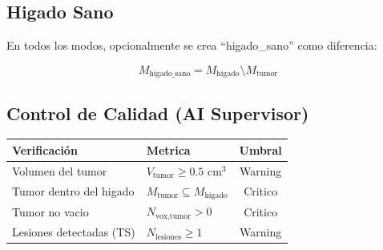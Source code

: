 \documentclass[12pt,a4paper]{article}
\begin{document}
\subsection{Higado Sano}

En todos los modos, opcionalmente se crea ``higado\_sano'' como diferencia:

\begin{equation}\label{eq:higado_sano}
    M_{\text{higado\_sano}} = M_{\text{higado}} \setminus M_{\text{tumor}}
\end{equation}


\begin{tcolorbox}[aiSupervisor]
\subsection*{Control de Calidad (AI Supervisor)}

\begin{table}[H]
\centering
\begin{tabular}{llc}
\toprule
\textbf{Verificación} & \textbf{Metrica} & \textbf{Umbral} \\
\midrule
Volumen del tumor & $V_{\text{tumor}} \geq 0.5$ cm$^3$ & Warning \\
Tumor dentro del higado & $M_{\text{tumor}} \subseteq M_{\text{higado}}$ & Critico \\
Tumor no vacio & $N_{\text{vox,tumor}} > 0$ & Critico \\
Lesiones detectadas (TS) & $N_{\text{lesiones}} \geq 1$ & Warning \\
\bottomrule
\end{tabular}
\end{table}

\newpage


\newpage


\newpage


\newpage



\end{tcolorbox}
\end{document}
